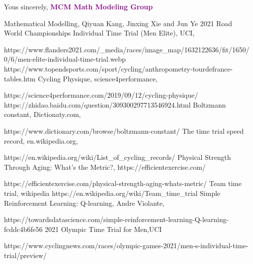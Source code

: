 \documentclass[14pt]{article}
\theoremstyle{definition}
\theoremstyle{remark}
\numberwithin{equation}{section}
\begin{document}
	Yous sincerely,
	\textcolor{purple}{\textbf{MCM Math Modeling Group}}
	\newpage
	\renewcommand\refname{References}
	\begin{thebibliography}{100}
		 Mathematical Modelling, Qiyuan Kang, Jinxing Xie and Jun Ye
		2021 Road World Championships Individual Time Trial (Men Elite), UCI,

		https://www.flanders2021.com/\_media/races/image\_map/1632122636/fit/1650/0/6/men-elite-individual-time-trial.webp
		https://www.topendsports.com/sport/cycling/anthropometry-tourdefrance-tables.htm
		Cycling Physique, science4performance,

		https://science4performance.com/2019/09/12/cycling-physique/
		https://zhidao.baidu.com/question/309300297713546924.html
		Boltzmann constant, Dictionaty.com,

		https://www.dictionary.com/browse/boltzmann-constant/
		The time trial speed record, en.wikipedia.org,

		https://en.wikipedia.org/wiki/List\_of\_cycling\_records/
		Physical Strength Through Aging: What’s the Metric?, https://efficientexercise.com/

		https://efficientexercise.com/physical-strength-aging-whats-metric/
		Team time trial, wikipedia
		https://en.wikipedia.org/wiki/Team\_time\_trial
		 Simple Reinforcement Learning: Q-learning, Andre Violante,

		 https://towardsdatascience.com/simple-reinforcement-learning-Q-learning-fcddc4b6fe56
		 2021 Olympic Time Trial for Men,UCI
		
		https://www.cyclingnews.com/races/olympic-games-2021/men-s-individual-time-trial/preview/
	\end{thebibliography}
\end{document}

